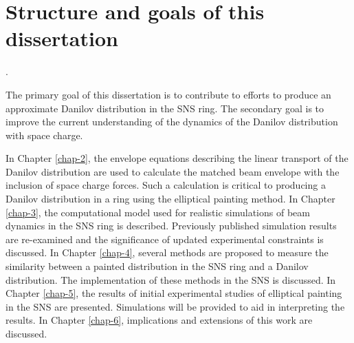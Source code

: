 \section{Structure and goals of this dissertation}\label{sec:Goals of this dissertation}.

The primary goal of this dissertation is to contribute to efforts to produce an approximate Danilov distribution in the SNS ring. The secondary goal is to improve the current understanding of the dynamics of the Danilov distribution with space charge.

In Chapter \ref{chap-2}, the envelope equations describing the linear transport of the Danilov distribution are used to calculate the matched beam envelope with the inclusion of space charge forces. Such a calculation is critical to producing a Danilov distribution in a ring using the elliptical painting method. In Chapter \ref{chap-3}, the computational model used for realistic simulations of beam dynamics in the SNS ring is described. Previously published simulation results are re-examined and the significance of updated experimental constraints is discussed. In Chapter \ref{chap-4}, several methods are proposed to measure the similarity between a painted distribution in the SNS ring and a Danilov distribution. The implementation of these methods in the SNS is discussed. In Chapter \ref{chap-5}, the results of initial experimental studies of elliptical painting in the SNS are presented. Simulations will be provided to aid in interpreting the results. In Chapter \ref{chap-6}, implications and extensions of this work are discussed.